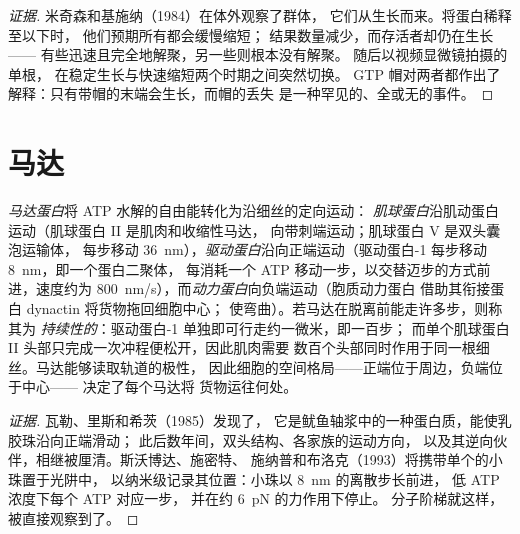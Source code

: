 \begin{proof}[证据]
米奇森和基施纳（1984）在体外观察了群体，
它们从生长而来。将蛋白稀释至以下时，
他们预期所有都会缓慢缩短；
结果数量减少，而存活者却仍在生长——
有些迅速且完全地解聚，另一些则根本没有解聚。
随后以视频显微镜拍摄的单根，
在稳定生长与快速缩短两个时期之间突然切换。
GTP 帽对两者都作出了解释：只有带帽的末端会生长，而帽的丢失
是一种罕见的、全或无的事件。
\end{proof}

\section{马达}

\begin{definition}[马达蛋白]\label{def:b3:cytoskeleton-motility:motors}
\emph{马达蛋白}将 ATP 水解的自由能转化为沿细丝的定向运动：
\emph{肌球蛋白}沿肌动蛋白运动（肌球蛋白 II 是肌肉和收缩性马达，
向带刺端运动；肌球蛋白 V 是双头囊泡运输体，
每步移动 \qty{36}{nm}），\emph{驱动蛋白}沿向正端运动（驱动蛋白-1
每步移动 \qty{8}{nm}，即一个蛋白二聚体，
每消耗一个 ATP 移动一步，以交替迈步的方式前进，速度约为
\qty{800}{nm/s}），而\emph{动力蛋白}向负端运动（胞质动力蛋白
借助其衔接蛋白 dynactin 将货物拖回细胞中心；
使弯曲）。若马达在脱离前能走许多步，则称其为
\emph{持续性的}：驱动蛋白-1 单独即可行走约一微米，即一百步；
而单个肌球蛋白 II 头部只完成一次冲程便松开，因此肌肉需要
数百个头部同时作用于同一根细丝。马达能够读取轨道的极性，
因此细胞的空间格局——正端位于周边，负端位于中心——
决定了每个马达将
货物运往何处。
\end{definition}

\begin{proof}[证据]
瓦勒、里斯和希茨（1985）发现了，
它是鱿鱼轴浆中的一种蛋白质，能使乳胶珠沿向正端滑动；
此后数年间，双头结构、各家族的运动方向，
以及其逆向伙伴，相继被厘清。斯沃博达、施密特、
施纳普和布洛克（1993）将携带单个的小珠置于光阱中，
以纳米级记录其位置：小珠以 \qty{8}{nm} 的离散步长前进，
低 ATP 浓度下每个 ATP 对应一步，
并在约 \qty{6}{pN} 的力作用下停止。
分子阶梯就这样，
被直接观察到了。
\end{proof}

